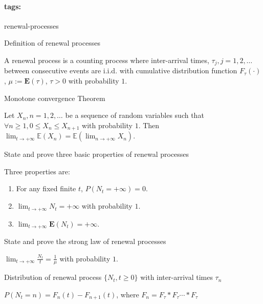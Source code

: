 \documentclass[11pt]{article}
\newcommand{\expect}[1]{\mathbf{E}(#1)}
\newcommand*{\tags}[1]{\paragraph{tags: }#1\bigskip}
\newcommand*{\xfield}[1]{\begin{mdframed}\centering #1\end{mdframed}\bigskip}
\newenvironment{field}{}{}
\newenvironment{note}{}{}
\begin{document}
%
\tags{renewal-processes}
\begin{note}
  \xfield{Definition of renewal processes}
  \begin{field}
    A renewal process is a counting process where inter-arrival times,
    \(\tau_j, j = 1,2,\ldots\) between consecutive events are
    i.i.d. with cumulative distribution function \(F_\tau(\cdot)\),
    \(\mu := \expect{\tau}\), \(\tau > 0\) with probability \(1\).
  \end{field}
\end{note}
%
\begin{note}
  \xfield{Monotone convergence Theorem}
  \begin{field}
    Let \(X_n, n = 1,2,\dots\) be a sequence of random variables such
    that \(\forall n \geq 1, 0 \leq X_n \leq X_{n+1}\) with
    probability \(1\). Then
    \(\lim_{t \to +\infty} \mathbb{E}(X_n) = \mathbb{E}(\lim_{n \to
      +\infty} X_n)\).
  \end{field}
\end{note}
%
\begin{note}
  \xfield{State and prove three basic properties of renewal processes}
  \begin{field}
    Three properties are:
    \begin{enumerate}
    \item For any fixed finite \(t\), \(P(N_t = +\infty) = 0\).
    \item \(\lim_{t \to +\infty} N_t = +\infty\) with probability \(1\).
    \item \(\lim_{t \to +\infty} \expect{N_t} = +\infty\).
    \end{enumerate}
  \end{field}
\end{note}
%
\begin{note}
  \xfield{State and prove the strong law of renewal processes}
  \begin{field}
    \(\displaystyle \lim_{t \to +\infty} \frac{N_t}{t} =
    \frac{1}{\mu}\) with probability \(1\).
  \end{field}
\end{note}
%
\begin{note}
  \xfield{Distribution of renewal process \(\{N_t, t \geq 0\}\) with
    inter-arrival times \(\tau_n\)}
  \begin{field}
    \(P(N_t = n) = F_n(t) - F_{n+1}(t)\), where
    \(F_n = F_\tau * F_\tau \cdots * F_\tau\)
  \end{field}
\end{note}
\end{document}
